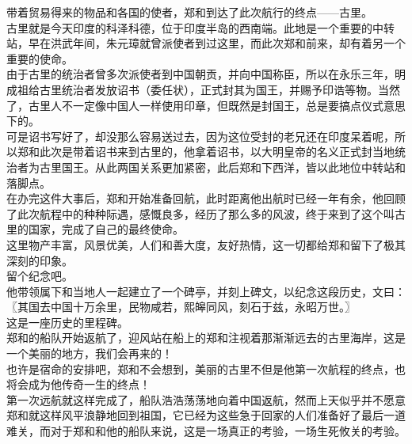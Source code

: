 \begin{multicols}{\theparacolNo}
带着贸易得来的物品和各国的使者，郑和到达了此次航行的终点——古里。\\

古里就是今天印度的科泽科德，位于印度半岛的西南端。此地是一个重要的中转站，早在洪武年间，朱元璋就曾派使者到过这里，而此次郑和前来，却有着另一个重要的使命。\\

由于古里的统治者曾多次派使者到中国朝贡，并向中国称臣，所以在永乐三年，明成祖给古里统治者发放诏书（委任状），正式封其为国王，并赐予印诰等物。当然了，古里人不一定像中国人一样使用印章，但既然是封国王，总是要搞点仪式意思下的。\\

可是诏书写好了，却没那么容易送过去，因为这位受封的老兄还在印度呆着呢，所以郑和此次是带着诏书来到古里的，他拿着诏书，以大明皇帝的名义正式封当地统治者为古里国王。从此两国关系更加紧密，此后郑和下西洋，皆以此地位中转站和落脚点。\\

在办完这件大事后，郑和开始准备回航，此时距离他出航时已经一年有余，他回顾了此次航程中的种种际遇，感慨良多，经历了那么多的风波，终于来到了这个叫古里的国家，完成了自己的最终使命。\\

这里物产丰富，风景优美，人们和善大度，友好热情，这一切都给郑和留下了极其深刻的印象。\\

留个纪念吧。\\

他带领属下和当地人一起建立了一个碑亭，并刻上碑文，以纪念这段历史，文曰：\\

〖其国去中国十万余里，民物咸若，熙皞同风，刻石于兹，永昭万世。〗\\

这是一座历史的里程碑。\\

郑和的船队开始返航了，迎风站在船上的郑和注视着那渐渐远去的古里海岸，这是一个美丽的地方，我们会再来的！\\

也许是宿命的安排吧，郑和不会想到，美丽的古里不但是他第一次航程的终点，也将会成为他传奇一生的终点！\\

第一次远航就这样完成了，船队浩浩荡荡地向着中国返航，然而上天似乎并不愿意郑和就这样风平浪静地回到祖国，它已经为这些急于回家的人们准备好了最后一道难关，而对于郑和和他的船队来说，这是一场真正的考验，一场生死攸关的考验。\\


\end{multicols}
